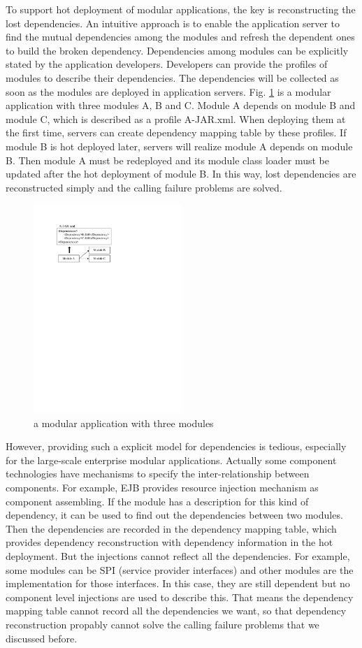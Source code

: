\documentclass[conference]{IEEEtran}
\begin{document}
To support hot deployment of modular applications, the key is reconstructing the lost dependencies. An intuitive approach is to enable the application server to find the mutual dependencies among the modules and refresh the dependent ones to build the broken dependency. Dependencies among modules can be explicitly stated by the application developers. Developers can provide the profiles of modules to describe their dependencies. The dependencies will be collected as soon as the modules are deployed in application servers. Fig. \ref{fig:example_abc} is a modular application with three modules A, B and C. Module A depends on module B and module C, which is described as a profile A-JAR.xml. When deploying them at the first time, servers can create dependency mapping table by these profiles. If module B is hot deployed later, servers will realize module A depends on module B. Then module A must be redeployed and its module class loader must be updated after the hot deployment of module B. In this way, lost dependencies are reconstructed simply and the calling failure problems are solved.

\begin{figure}[ht]
\centering
\includegraphics[width=2.2in]{ExampleThree.pdf}
\caption{a modular application with three modules}
\label{fig:example_abc}
\end{figure}


However, providing such a explicit model for dependencies is tedious, especially for the large-scale enterprise modular applications. Actually some component technologies have mechanisms to specify the inter-relationship between components. For example, EJB provides resource injection mechanism\cite{DI} as component assembling. If the module has a description for this kind of dependency, it can be used to find out the dependencies between two modules. Then the dependencies are recorded in the dependency mapping table, which provides dependency reconstruction with dependency information in the hot deployment. But the injections cannot reflect all the dependencies. For example, some modules can be SPI (service provider interfaces) and other modules are the implementation for those interfaces. In this case, they are still dependent but no component level injections are used to describe this. That means the dependency mapping table cannot record all the dependencies we want, so that dependency reconstruction propably cannot solve the calling failure problems that we discussed before.
\end{document}
